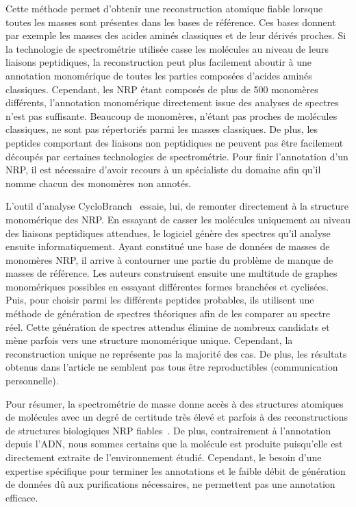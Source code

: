 Cette méthode permet d'obtenir une reconstruction atomique fiable lorsque toutes les masses sont présentes dans les bases de référence.
Ces bases donnent par exemple les masses des acides aminés classiques et de leur dérivés proches.
Si la technologie de spectrométrie utilisée casse les molécules au niveau de leurs liaisons peptidiques, la reconstruction peut plus facilement aboutir à une annotation monomérique de toutes les parties composées d'acides aminés classiques.
Cependant, les NRP étant composés de plus de 500 monomères différents, l'annotation monomérique directement issue des analyses de spectres n'est pas suffisante.
Beaucoup de monomères, n'étant pas proches de molécules classiques, ne sont pas répertoriés parmi les masses classiques.
De plus, les peptides comportant des liaisons non peptidiques ne peuvent pas être facilement découpés par certaines technologies de spectrométrie.
Pour finir l'annotation d'un NRP, il est nécessaire d'avoir recours à un spécialiste du domaine afin qu'il nomme chacun des monomères non annotés.

L'outil d'analyse CycloBranch~\cite{novak_cyclobranch:_2015} essaie, lui, de remonter directement à la structure monomérique des NRP.
En essayant de casser les molécules uniquement au niveau des liaisons peptidiques attendues, le logiciel génère des spectres qu'il analyse ensuite informatiquement.
Ayant constitué une base de données de masses de monomères NRP, il arrive à contourner une partie du problème de manque de masses de référence.
Les auteurs construisent ensuite une multitude de graphes monomériques possibles en essayant différentes formes branchées et cyclisées.
Puis, pour choisir parmi les différents peptides probables, ils utilisent une méthode de génération de spectres théoriques afin de les comparer au spectre réel.
Cette génération de spectres attendus élimine de nombreux candidats et mène parfois vers une structure monomérique unique.
Cependant, la reconstruction unique ne représente pas la majorité des cas.
De plus, les résultats obtenus dans l'article ne semblent pas tous être reproductibles (communication personnelle).

Pour résumer, la spectrométrie de masse donne accès à des structures atomiques de molécules avec un degré de certitude très élevé et parfois à des reconstructions de structures biologiques NRP fiables~\cite{mohimani_dereplication_2015}.
De plus, contrairement à l'annotation depuis l'ADN, nous sommes certains que la molécule est produite puisqu'elle est directement extraite de l'environnement étudié.
Cependant, le besoin d'une expertise spécifique pour terminer les annotations et le faible débit de génération de données dû aux purifications nécessaires, ne permettent pas une annotation efficace.


